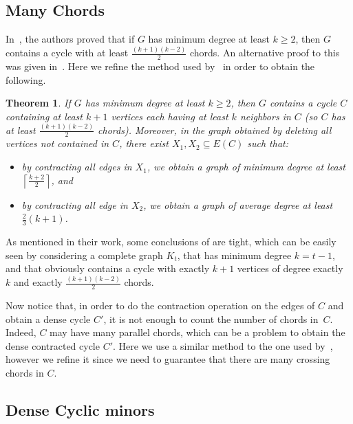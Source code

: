 \documentclass[11pt]{article}
\newtheorem{theo}{Theorem}[section]
\begin{document}
    \subsection*{Many Chords}

    In~\cite{GUPTA198037}, the authors proved that if $G$ has minimum degree at least $k\geq 2$, then $G$ contains a cycle with at least $\frac{(k+1)(k-2)}{2}$ chords. An alternative proof to this was given in~\cite{kral03}. Here we refine the method used by~\cite{GUPTA198037} in order to obtain the following.

    \begin{theo}
        \label{th:main}
	If $G$ has minimum degree at least $k\geq 2$, then $G$ contains a cycle
	$C$ containing at least $k+1$ vertices each having at least $k$
	neighbors in $C$ (so $C$ has at least $\frac{(k+1)(k-2)}{2}$ chords).
    Moreover, in the graph  obtained by deleting all vertices not contained in $C$, there exist $X_1, X_2 \subseteq E(C)$ such that: 
    \begin{itemize}
	\item by contracting all edges in $X_1$, we obtain a graph of minimum degree at least $\left\lceil \frac{k+2}{2}\right\rceil$, and
	\item by contracting all edge in $X_2$, we obtain a graph of average degree at least $\tfrac{2}{3}(k+1)$.
	\end{itemize}
\end{theo}
    
    


    As mentioned in their work, some conclusions of \cite{GUPTA198037} are tight, which can be easily seen by considering a complete graph $K_t$, that has minimum degree $k=t-1$, and that obviously contains a cycle with exactly $k+1$ vertices of degree exactly~$k$ and exactly $\frac{(k+1)(k-2)}{2}$ chords.
    
    Now notice that, in order to do the contraction operation on the edges of $C$ and obtain a dense cycle $C'$, it is not enough to count the number of chords in~$C$. Indeed, $C$ may have many parallel chords, which can be a problem to obtain the dense contracted cycle $C'$. Here we use a similar method to the one used by~\cite{GUPTA198037}, however we refine it since we need to guarantee that there are many crossing chords in $C$. 

 
 \subsection*{Dense Cyclic minors}
 
\end{document}
